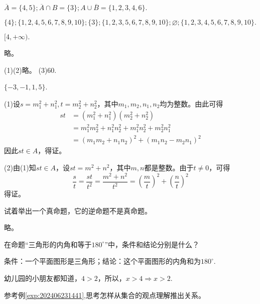 \documentclass[lang=cn,newtx,10pt,scheme=chinese]{elegantbook}
\begin{document}
\begin{exercise}
  $\overline{A}=\{4,5\};\overline{A}\cap B=\{3\};A\cup\overline{B}=\{1,2,3,4,6\}.$
\end{exercise}
\begin{exercise}
  $\{4\};\{1,2,4,5,6,7,8,9,10\};\{3\};\{1,2,3,5,6,7,8,9,10\};\varnothing ;\{1,2,3,4,5,6,7,8,9,10\}.$
\end{exercise}
\begin{exercise}
  $[4,+\infty).$
\end{exercise}
\begin{exercise}
  略。
\end{exercise}
\begin{exercise}
  (1)(2)略。
  (3)60.
\end{exercise}
\begin{exercise}
  $\{-3,-1,1,5\}$.
\end{exercise}
\begin{exercise}
  (1)设$s=m_1^2+n_1^2,t=m_2^2+n_2^2$，其中$m_1,m_2,n_1,n_2$均为整数。由此可得
  $$\begin{aligned}
    st& =(m_1^2+n_1^2)(m_2^2+n_2^2)  \\
    &=m_1^2m_2^2+n_1^2n_2^2+m_1^2n_2^2+m_2^2n_1^2 \\
    &=(m_1m_2+n_1n_2)^2+(m_1n_2-m_2n_1)^2
    \end{aligned}$$
  因此$st\in A$，得证。
  
  (2)由(1)知$st \in A$，设$st=m^2+n^2$，其中$m,n$都是整数。由于$t\neq 0$，可得$$\frac st=\frac{st}{t^2}=\frac{m^2+n^2}{t^2}=\left(\frac mt\right)^2+\left(\frac nt\right)^2$$
  得证。
\end{exercise}
\begin{exercise}\label{exer:202405021028}
  试着举出一个真命题，它的逆命题不是真命题。
\end{exercise}
\begin{solution}
  略。
\end{solution}
\begin{exercise}
  在命题“三角形的内角和等于$180^{\circ}$”中，条件和结论分别是什么？
\end{exercise}
\begin{solution}
  条件：一个平面图形是三角形；结论：这个平面图形的内角和为$180^{\circ}$.
\end{solution}
\begin{example}\label{exp:202406231441}
  幼儿园的小朋友都知道，$4>2$，所以，$x>4\Rightarrow x>2$.
\end{example}
\begin{problem}\label{202406262000}
  参考例\ref{exp:202406231441},思考怎样从集合的观点理解推出关系。
\end{problem}
\end{document}

